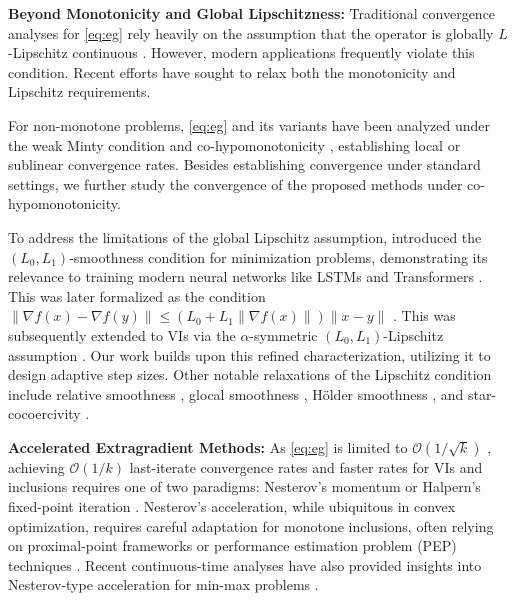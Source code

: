 \documentclass[letter,11pt]{article}
\begin{document}
\noindent\textbf{Beyond Monotonicity and Global Lipschitzness:}
Traditional convergence analyses for \eqref{eq:eg} rely heavily on the assumption that the operator is globally $L$-Lipschitz continuous \cite{Facchinei2003,mokhtari2020unified}. However, modern applications frequently violate this condition. Recent efforts have sought to relax both the monotonicity and Lipschitz requirements. 

For non-monotone problems, \eqref{eq:eg} and its variants have been analyzed under the weak Minty condition \cite{diakonikolas2021efficient,pethick2022escaping,pethick2023solving} and co-hypomonotonicity \cite{combettes2004proximal,luo2022last,tran2023extragradient}, establishing local or sublinear convergence rates. Besides establishing convergence under standard settings, we further study the convergence of the proposed methods under co-hypomonotonicity.

To address the limitations of the global Lipschitz assumption, \cite{zhang2019gradient} introduced the $(L_0, L_1)$-smoothness condition for minimization problems, demonstrating its relevance to training modern neural networks like LSTMs \cite{hochreiter1997long} and Transformers \cite{ahn2023linear}. This was later formalized as the condition $\|\nabla f(x) - \nabla f(y)\| \le (L_0 + L_1\|\nabla f(x)\|)\|x-y\|$ \cite{chen2023generalized,vankov2024optimizing,gorbunov2024methods}. This was subsequently extended to VIs via the $\alpha$-symmetric $(L_0, L_1)$-Lipschitz assumption \cite{pmlr-v235-vankov24a,xian2024delving,choudhuryextragradient}. Our work builds upon this refined characterization, utilizing it to design adaptive step sizes. Other notable relaxations of the Lipschitz condition include relative smoothness \cite{bauschke2017descent}, glocal smoothness \cite{fox2025glocal}, H\"{o}lder smoothness \cite{gorbunov2021high}, and star-cocoercivity \cite{loizou2021stochastic,beznosikov2023stochastic}.

\noindent\textbf{Accelerated Extragradient Methods:}
As \eqref{eq:eg} is limited to $\mathcal{O}(1/\sqrt{k})$ \cite{golowich2020last}, achieving $\mathcal{O}(1/k)$ last-iterate convergence rates and faster rates for VIs and inclusions requires one of two paradigms: Nesterov's momentum \cite{Nesterov1983,Nesterov2005c,Beck2009} or Halpern's fixed-point iteration \cite{halpern1967fixed}. 
Nesterov's acceleration, while ubiquitous in convex optimization, requires careful adaptation for monotone inclusions, often relying on proximal-point frameworks \cite{guler1992new,kim2021accelerated,attouch2020convergence} or performance estimation problem (PEP) techniques \cite{drori2014performance,ryu2020operator,gupta2022branch}. Recent continuous-time analyses have also provided insights into Nesterov-type acceleration for min-max problems \cite{Su2014,bot2022fast,shi2021understanding}.
\end{document}

